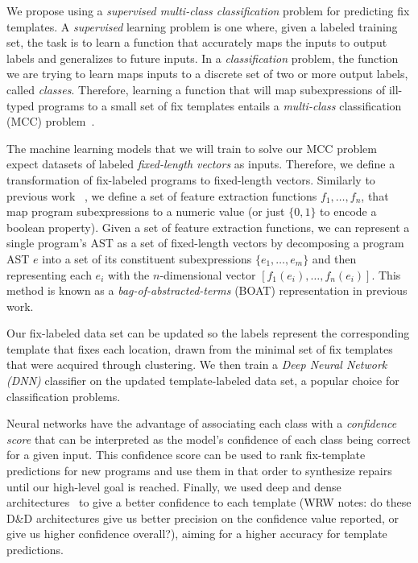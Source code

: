 We propose using a \emph{supervised multi-class classification} problem for
predicting fix templates. A \emph{supervised} learning problem is one
where,
given a labeled training set, the task is to learn a function that accurately
maps the inputs to output labels and generalizes to future inputs. In a
\emph{classification} problem, the function we are trying to learn maps inputs
to a discrete set of two or more output labels, called \emph{classes}.
Therefore, learning a function that will map subexpressions of ill-typed
programs to a small set of fix templates entails a \emph{multi-class}
classification (MCC) problem~\cite{FIXME}.

 The machine learning models that we will train to
solve our MCC problem expect datasets of labeled \emph{fixed-length vectors} as
inputs. Therefore, we define a transformation of fix-labeled programs to
fixed-length vectors. Similarly to previous work ~\citep{Seidel:2017}, we define
a set of feature extraction functions $f_1, \ldots, f_n$, that map program
subexpressions to a numeric value (or just $\{0, 1\}$ to encode a boolean
property). Given a set of feature extraction functions, we can represent a
single program's AST as a set of fixed-length vectors by decomposing a program
AST $e$ into a set of its constituent subexpressions $\{e_1, \ldots, e_m\}$ and
then representing each $e_i$ with the $n$-dimensional vector $[f_1(e_i), \ldots,
f_n(e_i)]$. This method is known as a \emph{bag-of-abstracted-terms} (BOAT)
representation in previous work.

Our fix-labeled data set can be updated so the labels represent the
corresponding template that fixes each location, drawn from the minimal set of
fix templates that were acquired through clustering. We then train a \emph{Deep
Neural Network (DNN)} classifier on the updated template-labeled data set, a
popular choice for classification problems.

Neural networks have the advantage of associating each class with a
\emph{confidence score} that can be interpreted as the model's confidence of
each class being correct for a given input. This confidence score can be
used to rank fix-template predictions for new programs and use them in that
order to synthesize repairs until our high-level goal is reached. Finally, we
used deep and dense architectures~\cite{FIXME} to give a better confidence
to each template
(WRW notes: do these D\&D architectures give us better precision on
the confidence value reported, or give us higher confidence overall?),
aiming for a higher accuracy for template predictions.

